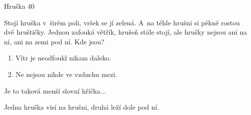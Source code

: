 Hruška
40%

Stojí hruška v~širém poli, vršek se jí zelená. A~na téhle hrušni si pěkně rostou dvě hruštičky.
Jednou zafouká větřík, hrušeň stále stojí, ale hrušky nejsou ani na ní, ani na zemi pod ní. Kde jsou?

\begin{enumerate}
	\item Vítr je neodfoukl nikam daleko.
	\item Ne nejsou nikde ve vzduchu mezi.
\end{enumerate}

Je to taková menší slovní hříčka...

Jedna hruška visí na hrušni, druhá leží dole pod ní.
